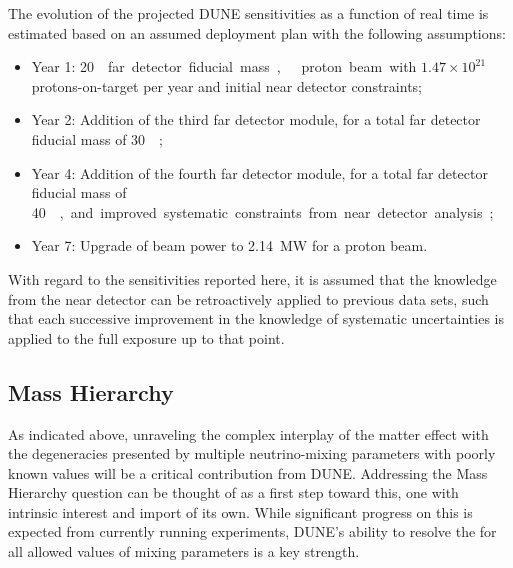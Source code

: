 The evolution of the projected DUNE sensitivities as a function of real time is estimated based on an assumed deployment plan
with the following assumptions:
%
\begin{itemize}
\item Year 1: \SI{20}\kt{} far detector fiducial mass,  
  proton beam with $1.47 \times 10^{21}$ protons-on-target per year 
  and initial near detector constraints;
\item Year 2: Addition of the third  far detector module, for a total far detector fiducial mass of
  \SI{30}\kt;
\item Year 4: Addition of the fourth  far detector module, for a total far detector fiducial mass of
  \SI{40}\kt, and improved systematic constraints from near detector analysis;
 \item Year 7: Upgrade of beam power to \SI{2.14}{\MW} for a 
  proton beam.
\end{itemize}
With regard to the sensitivities reported here, it is assumed that the knowledge from the near detector can be
retroactively applied to previous data sets, such that each
successive improvement in the knowledge of systematic uncertainties
is applied to the full exposure
up to that point.

\subsection{Mass Hierarchy}
\label{sec:exec-summ-physics-mh-cpv}

As indicated above, unraveling the complex interplay of the matter effect with the degeneracies presented by multiple neutrino-mixing parameters with poorly known values will be a critical contribution from DUNE. Addressing the Mass Hierarchy question can be thought of as a first step toward this, one with intrinsic interest and import of its own.  While significant progress on this is expected from currently running experiments, DUNE's ability to resolve the  for all allowed values of mixing parameters is a key strength.

